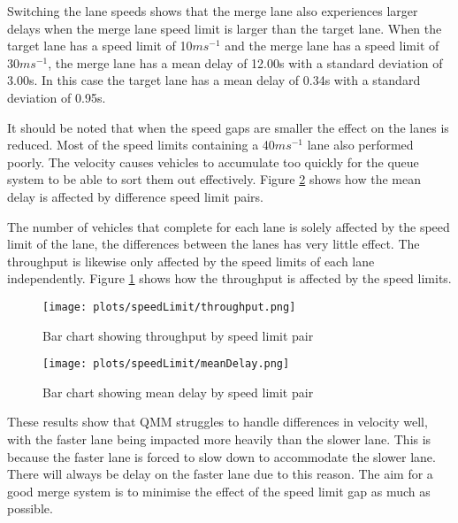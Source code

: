 Switching the lane speeds shows that the merge lane also experiences larger delays when the merge lane speed limit is larger than the target lane. When the target lane has a speed limit of 10$\si{ms^{-1}}$ and the merge lane has a speed limit of 30$\si{ms^{-1}}$, the merge lane has a mean delay of 12.00\si{s} with a standard deviation of 3.00\si{s}. In this case the target lane has a mean delay of 0.34\si{s} with a standard deviation of 0.95\si{s}.

It should be noted that when the speed gaps are smaller the effect on the lanes is reduced. Most of the speed limits containing a 40$\si{ms^{-1}}$ lane also performed poorly. The velocity causes vehicles to accumulate too quickly for the queue system to be able to sort them out effectively. Figure \ref{fig:meanDelaySpeedLimit} shows how the mean delay is affected by difference speed limit pairs.

The number of vehicles that complete for each lane is solely affected by the speed limit of the lane, the differences between the lanes has very little effect. The throughput is likewise only affected by the speed limits of each lane independently. Figure \ref{fig:throughputSpeedLimit} shows how the throughput is affected by the speed limits.

\begin{figure}[htb]
\texttt{[image: plots/speedLimit/throughput.png]}
\caption{Bar chart showing throughput by speed limit pair}
\label{fig:throughputSpeedLimit}
\end{figure}

\begin{figure}[p]
\centerline{
	\texttt{[image: plots/speedLimit/meanDelay.png]}
}
\caption{Bar chart showing mean delay by speed limit pair}
\label{fig:meanDelaySpeedLimit}
\end{figure}

These results show that QMM struggles to handle differences in velocity well, with the faster lane being impacted more heavily than the slower lane. This is because the faster lane is forced to slow down to accommodate the slower lane. There will always be delay on the faster lane due to this reason. The aim for a good merge system is to minimise the effect of the speed limit gap as much as possible.


